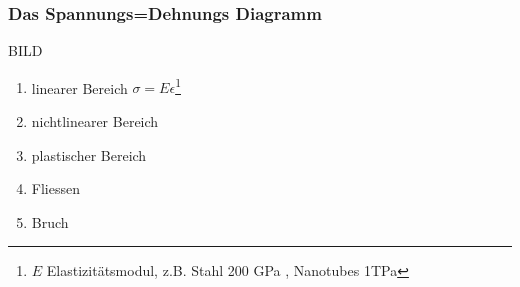 \subsubsection{Das Spannungs=Dehnungs Diagramm}
BILD \\
\begin{enumerate}
	\item linearer Bereich $\sigma = E \epsilon$\footnote{$E$ Elastizitätsmodul, z.B. Stahl 200 GPa , Nanotubes 1TPa}
	\item nichtlinearer Bereich
	\item plastischer Bereich
	\item Fliessen
	\item Bruch
\end{enumerate}
